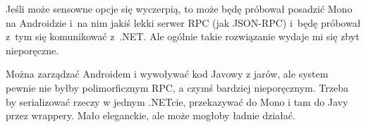 Jeśli może sensowne opcje się wyczerpią, to może będę próbował posadzić Mono na Androidzie i~na nim jakiś lekki serwer RPC (jak JSON-RPC) i~będę próbował z~tym się komunikować z~.NET\@. Ale ogólnie takie rozwiązanie wydaje mi się zbyt nieporęczne.

Można zarządzać Androidem i wywoływać kod Javowy z jarów, ale system pewnie nie byłby polimorficznym RPC, a czymś bardziej nieporęcznym. Trzeba by serializować rzeczy w jednym .NETcie, przekazywać do Mono i tam do Javy przez wrappery. Mało eleganckie, ale może mogłoby ładnie działać.

%

%
%



